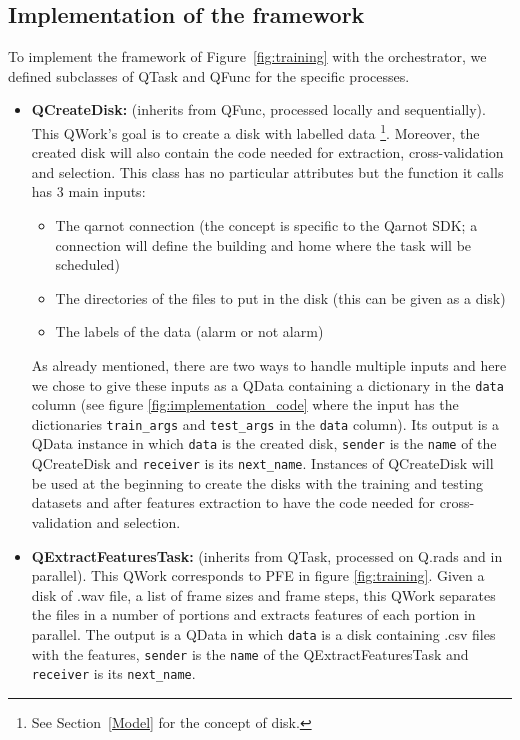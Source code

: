 \documentclass[10pt, conference, compsocconf]{IEEEtran}
\begin{document}
\subsection{Implementation of the framework}
To implement the framework of Figure~\ref{fig:training} with the orchestrator, we defined subclasses of QTask and QFunc for the specific processes.
\begin{itemize}
\item \textbf{QCreateDisk:} (inherits from QFunc, processed locally and sequentially). This QWork's goal is to create a disk with labelled data \footnote{See Section~\ref{Model} for the concept of disk.}. Moreover, the created disk will also contain the code needed for extraction, cross-validation and selection. This class has no particular attributes but the function it calls has 3 main inputs: 
  \begin{itemize}
  \item The qarnot connection (the concept is specific to the Qarnot SDK; a connection will define the building and home where the task will be scheduled)
  \item The directories of the files to put in the disk (this can be given as a disk)
  \item The labels of the data (alarm or not alarm)
  \end{itemize}
  As already mentioned, there are two ways to handle multiple inputs and here we chose to give these inputs as a QData containing a dictionary in the \texttt{data} column (see figure \ref{fig:implementation_code} where the input has the dictionaries \texttt{train\_args} and \texttt{test\_args} in the \texttt{data} column).  
  Its output is a QData instance in which \texttt{data} is the created disk, \texttt{sender} is the \texttt{name} of the QCreateDisk and \texttt{receiver} is its \texttt{next\_name}. Instances of QCreateDisk will be used at the beginning to create the disks with the training and testing datasets and after features extraction to have the code needed for cross-validation and selection.  
\item \textbf{QExtractFeaturesTask:} (inherits from QTask, processed on Q.rads and in parallel). This QWork corresponds to PFE in figure \ref{fig:training}. Given a disk of .wav file, a list of frame sizes and frame steps, this QWork separates the files in a number of portions and extracts features of each portion in parallel. The output is a QData in which \texttt{data} is a disk containing .csv files with the features, \texttt{sender} is the \texttt{name} of the QExtractFeaturesTask and \texttt{receiver} is its \texttt{next\_name}.

\end{itemize}
\end{document}

